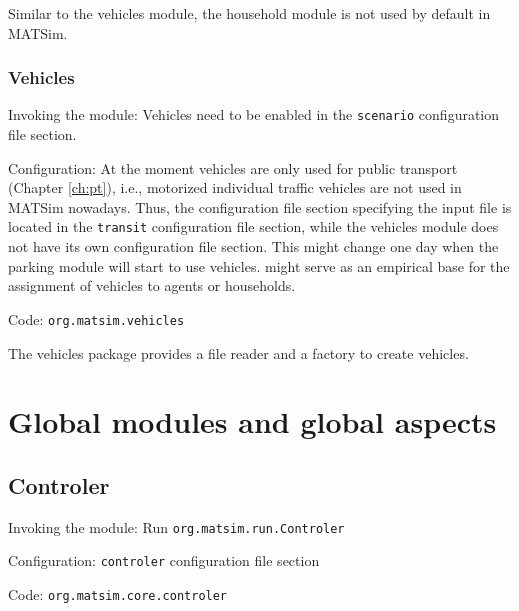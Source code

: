 Similar to the vehicles module, the household module is not used by default in MATSim.

\subsubsection{Vehicles}
\label{sec:vehicles}

\begin{compactitem}
\item Invoking the module: Vehicles need to be enabled in the \lstinline|scenario| configuration file section.
\item Configuration: At the moment vehicles are only used for public transport (Chapter \ref{ch:pt}), i.e., motorized individual traffic vehicles are not used in MATSim nowadays. Thus, the configuration file section specifying the input file is located in the \lstinline|transit| configuration file section, while the vehicles module does not have its own configuration file section.     This might change one day when the parking module will start to use vehicles. \citet[][]{JaeggiEtAl_TRR_2012} might serve as an empirical base for the assignment of vehicles to agents or households.
\item Code: \lstinline|org.matsim.vehicles|
\end{compactitem}

The vehicles package provides a file reader and a factory to create vehicles.



\section{Global modules and global aspects}

\subsection{Controler}
\label{sec:controler}
\begin{compactitem}
\item Invoking the module: Run \lstinline|org.matsim.run.Controler|
\item Configuration: \lstinline|controler| configuration file section
\item Code: \lstinline|org.matsim.core.controler|
\end{compactitem}

